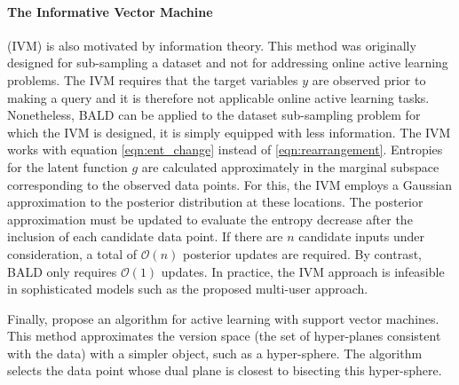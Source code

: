 \paragraph{The Informative Vector Machine} (IVM) \citep{lawrence2002} is also motivated by information theory.
This method was originally designed for sub-sampling a dataset and not for addressing online active learning problems.
The IVM requires that the target variables $y$ are observed prior to making a query and it is therefore not applicable online active learning tasks.
Nonetheless, BALD can be applied to the dataset sub-sampling problem for which the IVM is designed, it is simply equipped with less information.
The IVM works with equation \eqref{eqn:ent_change} instead of \eqref{eqn:rearrangement}. Entropies for the latent function $g$ are
calculated approximately in the marginal subspace corresponding to the observed data points.
For this, the IVM employs a Gaussian approximation to the posterior distribution at these locations.
The posterior approximation must be updated to evaluate the entropy decrease after the inclusion
of each candidate data point. If there are $n$ candidate inputs under consideration, a total of $\mathcal{O}(n)$ posterior
updates are required. By contrast, BALD only requires $\mathcal{O}(1)$ updates.
In practice, the IVM approach is infeasible in sophisticated models such as the proposed multi-user approach.

Finally, \cite{tong2001} propose an algorithm for active learning with support vector machines.
This method approximates the version space (the set of hyper-planes consistent with the data)
with a simpler object, such as a hyper-sphere. The algorithm selects the data point whose
dual plane is closest to bisecting this hyper-sphere. 

